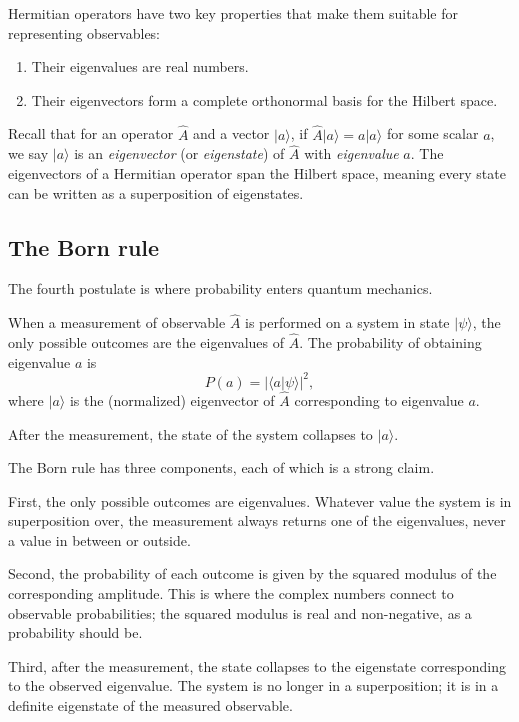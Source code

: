 Hermitian operators have two key properties that make them suitable
for representing observables:

\begin{enumerate}[leftmargin=2em]
    \item Their eigenvalues are real numbers.
    \item Their eigenvectors form a complete orthonormal basis for
    the Hilbert space.
\end{enumerate}

Recall that for an operator $\hat{A}$ and a vector $|a\rangle$, if
$\hat{A} |a\rangle = a |a\rangle$ for some scalar $a$, we say
$|a\rangle$ is an \emph{eigenvector} (or \emph{eigenstate}) of
$\hat{A}$ with \emph{eigenvalue} $a$. The eigenvectors of a
Hermitian operator span the Hilbert space, meaning every state can
be written as a superposition of eigenstates.

\subsection{The Born rule}

The fourth postulate is where probability enters quantum mechanics.

\begin{principlebox}
When a measurement of observable $\hat{A}$ is performed on a system
in state $|\psi\rangle$, the only possible outcomes are the
eigenvalues of $\hat{A}$. The probability of obtaining eigenvalue
$a$ is
\[
    P(a) = |\langle a | \psi\rangle|^2,
\]
where $|a\rangle$ is the (normalized) eigenvector of $\hat{A}$
corresponding to eigenvalue $a$.

After the measurement, the state of the system collapses to
$|a\rangle$.
\end{principlebox}

The Born rule has three components, each of which is a strong
claim.

First, the only possible outcomes are eigenvalues. Whatever value
the system is in superposition over, the measurement always returns
one of the eigenvalues, never a value in between or outside.

Second, the probability of each outcome is given by the squared
modulus of the corresponding amplitude. This is where the complex
numbers connect to observable probabilities; the squared modulus is
real and non-negative, as a probability should be.

Third, after the measurement, the state collapses to the eigenstate
corresponding to the observed eigenvalue. The system is no longer
in a superposition; it is in a definite eigenstate of the measured
observable.

